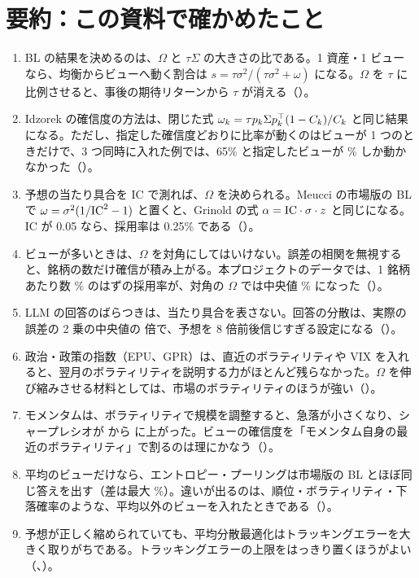 \section*{要約：この資料で確かめたこと}

\begin{keybox}[要約]
\begin{enumerate}
\item BL の結果を決めるのは、$\Omega$ と $\tau\Sigma$ の大きさの比である。1 資産・1 ビューなら、均衡からビューへ動く割合は $s=\tau\sigma^2/(\tau\sigma^2+\omega)$ になる。$\Omega$ を $\tau$ に比例させると、事後の期待リターンから $\tau$ が消える（）。
\item Idzorek の確信度の方法は、閉じた式 $\omega_k=\tau p_k\Sigma p_k^{\top}(1-C_k)/C_k$ と同じ結果になる。ただし、指定した確信度どおりに比率が動くのはビューが 1 つのときだけで、3 つ同時に入れた例では、65\% と指定したビューが \% しか動かなかった（）。
\item 予想の当たり具合を IC で測れば、$\Omega$ を決められる。Meucci の市場版の BL で $\omega=\sigma^2(1/\mathrm{IC}^2-1)$ と置くと、Grinold の式 $\alpha=\mathrm{IC}\cdot\sigma\cdot z$ と同じになる。IC が 0.05 なら、採用率は 0.25\% である（）。
\item ビューが多いときは、$\Omega$ を対角にしてはいけない。誤差の相関を無視すると、銘柄の数だけ確信が積み上がる。本プロジェクトのデータでは、1 銘柄あたり数 \% のはずの採用率が、対角の $\Omega$ では中央値 \% になった（）。
\item LLM の回答のばらつきは、当たり具合を表さない。回答の分散は、実際の誤差の 2 乗の中央値の  倍で、予想を 8 倍前後信じすぎる設定になる（）。
\item 政治・政策の指数（EPU、GPR）は、直近のボラティリティや VIX を入れると、翌月のボラティリティを説明する力がほとんど残らなかった。$\Omega$ を伸び縮みさせる材料としては、市場のボラティリティのほうが強い（）。
\item モメンタムは、ボラティリティで規模を調整すると、急落が小さくなり、シャープレシオが  から  に上がった。ビューの確信度を「モメンタム自身の最近のボラティリティ」で割るのは理にかなう（）。
\item 平均のビューだけなら、エントロピー・プーリングは市場版の BL とほぼ同じ答えを出す（差は最大 \%）。違いが出るのは、順位・ボラティリティ・下落確率のような、平均以外のビューを入れたときである（）。
\item 予想が正しく縮められていても、平均分散最適化はトラッキングエラーを大きく取りがちである。トラッキングエラーの上限をはっきり置くほうがよい（、）。
\end{enumerate}
\end{keybox}
